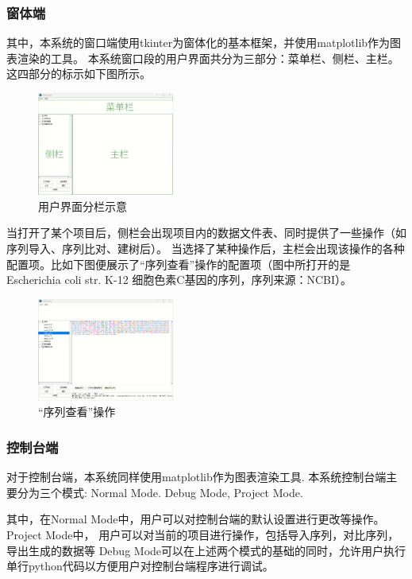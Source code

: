 \documentclass{article}
\begin{document}
\begin{multicols}{2}
\subsubsection{窗体端}
\par
其中，本系统的窗口端使用tkinter为窗体化的基本框架，并使用matplotlib作为图表渲染的工具。
本系统窗口段的用户界面共分为三部分：菜单栏、侧栏、主栏。这四部分的标示如下图所示。
\par
\begin{figure}[H]
\centering
\includegraphics[width=0.4\textwidth]{A.png}
\caption{用户界面分栏示意}
\end{figure}
\par
当打开了某个项目后，侧栏会出现项目内的数据文件表、同时提供了一些操作（如序列导入、序列比对、建树后）。
当选择了某种操作后，主栏会出现该操作的各种配置项。比如下图便展示了“序列查看”操作的配置项（图中所打开的是 Escherichia coli str. K-12 细胞色素C基因的序列，序列来源：NCBI）。
\par
\begin{figure}[H]
\centering
\includegraphics[width=0.4\textwidth]{B.png}
\caption{“序列查看”操作}
\end{figure}
\subsubsection{控制台端}
\par
对于控制台端，本系统同样使用matplotlib作为图表渲染工具.
本系统控制台端主要分为三个模式: Normal Mode. Debug Mode, Project Mode.
\par
其中，在Normal Mode中，用户可以对控制台端的默认设置进行更改等操作。
Project Mode中， 用户可以对当前的项目进行操作，包括导入序列，对比序列，导出生成的数据等
Debug Mode可以在上述两个模式的基础的同时，允许用户执行单行python代码以方便用户对控制台端程序进行调试。


\end{multicols}
\end{document}

